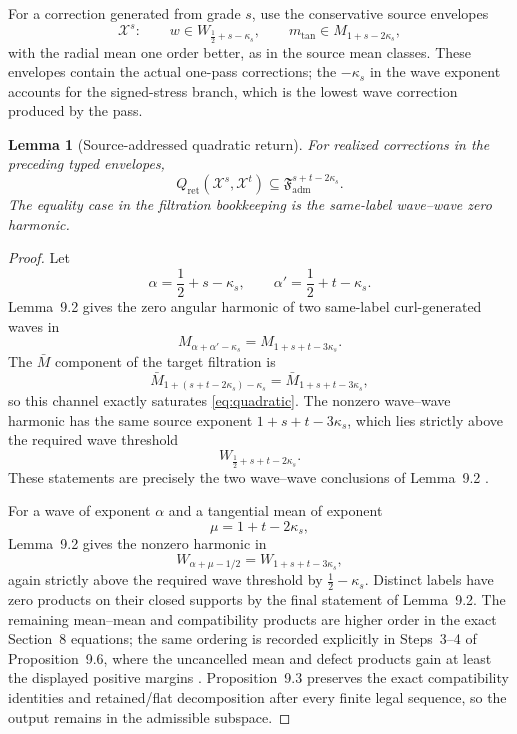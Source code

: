 \documentclass[11pt]{article}
\numberwithin{equation}{section}
\theoremstyle{highend}
\newtheorem{lemma}[theorem]{Lemma}
\theoremstyle{definition}
\newcommand{\Fadm}{\mathfrak F_{\mathrm{adm}}}
\newcommand{\X}{\mathcal X}
\newcommand{\Qret}{Q_{\mathrm{ret}}}
\begin{document}
For a correction generated from grade $s$, use the conservative source envelopes
\[
\X^s:\qquad
w\in W_{\frac12+s-\kappa_s},
\qquad
m_{\mathrm{tan}}\in M_{1+s-2\kappa_s},
\]
with the radial mean one order better, as in the source mean classes. These envelopes contain the actual one-pass corrections; the $-\kappa_s$ in the wave exponent accounts for the signed-stress branch, which is the lowest wave correction produced by the pass.

\begin{lemma}[Source-addressed quadratic return]\label{lem:quadratic-trace}
For realized corrections in the preceding typed envelopes,
\begin{equation}\label{eq:quadratic}
\Qret(\X^s,\X^t)\subseteq \Fadm^{s+t-2\kappa_s}.
\end{equation}
The equality case in the filtration bookkeeping is the same-label wave--wave zero harmonic.
\end{lemma}

\begin{proof}
Let
\[
\alpha=\frac12+s-\kappa_s,
\qquad
\alpha'=\frac12+t-\kappa_s.
\]
Lemma~9.2 gives the zero angular harmonic of two same-label curl-generated waves in
\[
M_{\alpha+\alpha'-\kappa_s}
=
M_{1+s+t-3\kappa_s}.
\]
The $\bar M$ component of the target filtration is
\[
\bar M_{1+(s+t-2\kappa_s)-\kappa_s}
=
\bar M_{1+s+t-3\kappa_s},
\]
so this channel exactly saturates \eqref{eq:quadratic}. The nonzero wave--wave harmonic has the same source exponent $1+s+t-3\kappa_s$, which lies strictly above the required wave threshold
\[
W_{\frac12+s+t-2\kappa_s}.
\]
These statements are precisely the two wave--wave conclusions of Lemma~9.2 \cite[pp.~102--103]{OpenAI2026NS}.

For a wave of exponent $\alpha$ and a tangential mean of exponent
\[
\mu=1+t-2\kappa_s,
\]
Lemma~9.2 gives the nonzero harmonic in
\[
W_{\alpha+\mu-1/2}
=
W_{1+s+t-3\kappa_s},
\]
again strictly above the required wave threshold by $\frac12-\kappa_s$. Distinct labels have zero products on their closed supports by the final statement of Lemma~9.2. The remaining mean--mean and compatibility products are higher order in the exact Section~8 equations; the same ordering is recorded explicitly in Steps~3--4 of Proposition~9.6, where the uncancelled mean and defect products gain at least the displayed positive margins \cite[pp.~110--111]{OpenAI2026NS}. Proposition~9.3 preserves the exact compatibility identities and retained/flat decomposition after every finite legal sequence, so the output remains in the admissible subspace.
\end{proof}
\end{document}
